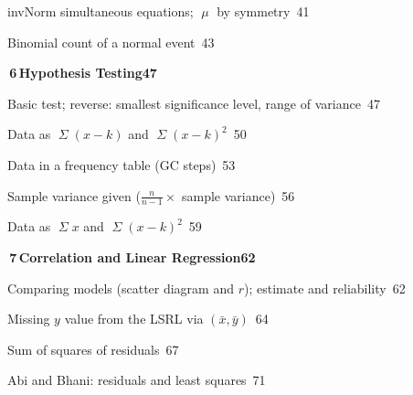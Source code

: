 {\noindent{}\quad invNorm simultaneous equations; $\mitmu $ by symmetry\dotfill\ 41\par
\noindent{}\quad Binomial count of a normal event\dotfill\ 43\par
\medskip\noindent\colorbox{blue!8}{\parbox{\dimexpr\textwidth-2\fboxsep}{\large\bfseries\color{blue!50!black}\colorbox{blue!50!black}{\color{white}\,6\,}\quad Hypothesis Testing\hfill 47}}\par\nopagebreak\smallskip\nopagebreak
\noindent{}\quad Basic test; reverse: smallest significance level, range of variance\dotfill\ 47\par
\noindent{}\quad Data as $\mitSigma (x-k)$ and $\mitSigma (x-k)^2$\dotfill\ 50\par
\noindent{}\quad Data in a frequency table (GC steps)\dotfill\ 53\par
\noindent{}\quad Sample variance given ($\frac {n}{n-1}\times $ sample variance)\dotfill\ 56\par
\noindent{}\quad Data as $\mitSigma x$ and $\mitSigma (x-k)^2$\dotfill\ 59\par
\medskip\noindent\colorbox{blue!8}{\parbox{\dimexpr\textwidth-2\fboxsep}{\large\bfseries\color{blue!50!black}\colorbox{blue!50!black}{\color{white}\,7\,}\quad Correlation and Linear Regression\hfill 62}}\par\nopagebreak\smallskip\nopagebreak
\noindent{}\quad Comparing models (scatter diagram and $r$); estimate and reliability\dotfill\ 62\par
\noindent{}\quad Missing $y$ value from the LSRL via $(\bar x,\bar y)$\dotfill\ 64\par
\noindent{}\quad Sum of squares of residuals\dotfill\ 67\par
\noindent{}\quad Abi and Bhani: residuals and least squares\dotfill\ 71\par
}
